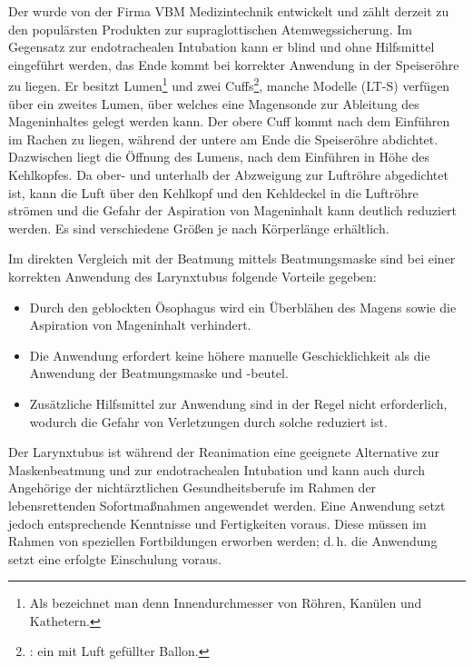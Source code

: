 {\label{topic:larynxtubus}
Der  wurde von der Firma VBM
Medizintechnik entwickelt und zählt derzeit zu den
populärsten Produkten zur supraglottischen
Atemwegssicherung. Im Gegensatz zur endotrachealen
Intubation kann er blind und ohne Hilfsmittel eingeführt
werden, das Ende kommt bei korrekter Anwendung in der
Speiseröhre zu liegen. Er besitzt 
Lumen\footnote{Als  bezeichnet man denn
Innendurchmesser von Röhren, Kanülen und Kathetern.} und
zwei Cuffs\footnote{:
ein mit Luft gefüllter Ballon.}, manche Modelle (LT-S) verfügen über ein zweites Lumen, über
welches eine Magensonde zur Ableitung des Mageninhaltes
gelegt werden kann. Der obere Cuff kommt nach dem Einführen
im Rachen zu liegen, während der untere am Ende die
Speiseröhre abdichtet.
Dazwischen liegt die Öffnung des Lumens, nach dem Einführen
in Höhe des Kehlkopfes. Da ober- und unterhalb der
Abzweigung zur Luftröhre abgedichtet ist, kann die Luft über
den Kehlkopf und den Kehldeckel in die Luftröhre strömen und
die Gefahr der Aspiration von Mageninhalt kann deutlich
reduziert werden. Es sind verschiedene Größen je nach
Körperlänge erhältlich.
\cite{Asai2005} %

Im direkten Vergleich mit der Beatmung mittels
Beatmungsmaske
sind bei einer korrekten Anwendung des Larynxtubus{\texttrademark} folgende
Vorteile gegeben:

\begin{itemize}
  \item Durch den geblockten Ösophagus wird ein Überblähen
  des Magens sowie die Aspiration von Mageninhalt
  verhindert.
  \item Die Anwendung erfordert keine höhere manuelle
  Geschicklichkeit als die Anwendung der Beatmungsmaske und
  -beutel.
  \item Zusätzliche Hilfsmittel zur Anwendung sind in der
  Regel nicht erforderlich, wodurch die Gefahr von
  Verletzungen durch solche reduziert ist.
\end{itemize}

Der Larynxtubus{\texttrademark} ist während der Reanimation
eine geeignete Alternative zur Maskenbeatmung und zur
endotrachealen Intubation und kann auch durch Angehörige der
nichtärztlichen Gesundheitsberufe im Rahmen der
lebensrettenden Sofortmaßnahmen angewendet werden.
Eine Anwendung setzt jedoch entsprechende
Kenntnisse und Fertigkeiten voraus. Diese müssen im Rahmen
von speziellen Fortbildungen erworben werden; d.\,h. die
Anwendung setzt eine erfolgte Einschulung voraus.
\cite{BMG-92250_0080-II_A_2010_2010-12-15}
}{}{}{}{}{}

